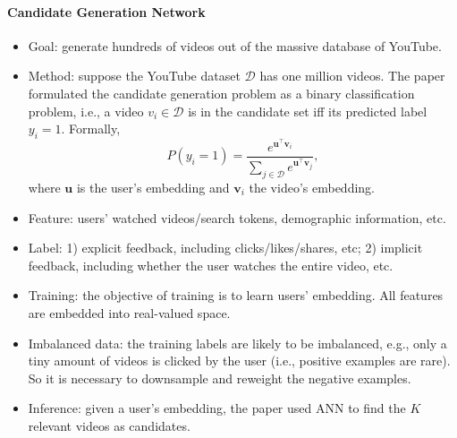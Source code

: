     \paragraph{Candidate Generation Network}
        \begin{itemize}
            \item Goal: generate hundreds of videos out of the massive database of YouTube.
            \item Method: suppose the YouTube dataset $\mathcal{D}$ has one million videos. 
            The paper formulated the candidate generation problem as a binary classification problem, i.e., a video $v_i \in \mathcal{D}$ is in the candidate set iff its predicted label  $y_i = 1$.
            Formally,
                \begin{equation}
                    P(y_i = 1) = \frac{e^{\bm{u}^\top \bm{v}_i}}{ \sum_{j \in \mathcal{D}}^{}{e^{\bm{u}^\top \bm{v}_j}}},
                \end{equation}
            where $\bm{u}$ is the user's embedding and $\bm{v}_i$ the video's embedding.
            \item Feature: users' watched videos/search tokens, demographic information, etc.
            \item Label: 1) explicit feedback, including clicks/likes/shares, etc; 2) implicit feedback, including whether the user watches the entire video, etc.
            \item Training: the objective of training is to learn users' embedding.
            All features are embedded into real-valued space.
            \item Imbalanced data: the training labels are likely to be imbalanced, e.g., only a tiny amount of videos is clicked by the user (i.e., positive examples are rare). 
            So it is necessary to downsample and reweight the negative examples.
            \item Inference: given a user's embedding, the paper used ANN to find the $K$ relevant videos as candidates. 
        \end{itemize}
